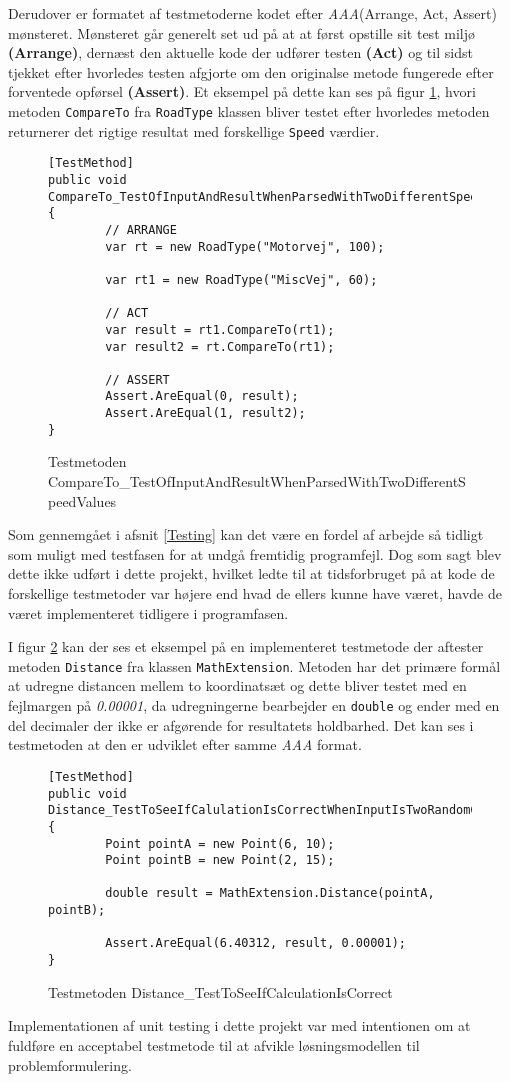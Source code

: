 \vspace{5mm}

Derudover er formatet af testmetoderne kodet efter \textit{AAA}(Arrange, Act, Assert) mønsteret. Mønsteret går generelt set ud på at at først opstille sit test miljø \textbf{(Arrange)}, dernæst den aktuelle kode der udfører testen \textbf{(Act)} og til sidst tjekket efter hvorledes testen afgjorte om den originalse metode fungerede efter forventede opførsel \textbf{(Assert)}. Et eksempel på dette kan ses på figur \ref{comparetotestmetode}, hvori metoden \texttt{CompareTo} fra \texttt{RoadType} klassen bliver testet efter hvorledes metoden returnerer det rigtige resultat med forskellige \texttt{Speed} værdier.

\begin{figure}[H]
\begin{lstlisting}
[TestMethod]
public void CompareTo_TestOfInputAndResultWhenParsedWithTwoDifferentSpeedValues()
{
		// ARRANGE
		var rt = new RoadType("Motorvej", 100);
           
		var rt1 = new RoadType("MiscVej", 60);

		// ACT
		var result = rt1.CompareTo(rt1);
		var result2 = rt.CompareTo(rt1);

		// ASSERT    
		Assert.AreEqual(0, result);
		Assert.AreEqual(1, result2);
}
\end{lstlisting}
\caption{Testmetoden CompareTo\_TestOfInputAndResultWhenParsedWithTwoDifferentSpeedValues}\label{comparetotestmetode}
\end{figure}

Som gennemgået i afsnit \ref{Testing} kan det være en fordel af arbejde så tidligt som muligt med testfasen for at undgå fremtidig programfejl. Dog som sagt blev dette ikke udført i dette projekt, hvilket ledte til at tidsforbruget på at kode de forskellige testmetoder var højere end hvad de ellers kunne have været, havde de været implementeret tidligere i programfasen.

I figur \ref{DistanceTestMethod} kan der ses et eksempel på en implementeret testmetode der aftester metoden \texttt{Distance} fra klassen \texttt{MathExtension}. Metoden har det primære formål at udregne distancen mellem to koordinatsæt og dette bliver testet med en fejlmargen på \textit{0.00001}, da udregningerne bearbejder en \texttt{double} og ender med en del decimaler der ikke er afgørende for resultatets holdbarhed. Det kan ses i testmetoden at den er udviklet efter samme \textit{AAA} format.

\begin{figure}[H]
\begin{lstlisting}
[TestMethod]
public void Distance_TestToSeeIfCalulationIsCorrectWhenInputIsTwoRandomCoords()
{
		Point pointA = new Point(6, 10);
		Point pointB = new Point(2, 15);

        double result = MathExtension.Distance(pointA, pointB);

        Assert.AreEqual(6.40312, result, 0.00001);
}
\end{lstlisting}
\caption{Testmetoden Distance\_TestToSeeIfCalculationIsCorrect}\label{DistanceTestMethod}
\end{figure}

Implementationen af unit testing i dette projekt var med intentionen om at fuldføre en acceptabel testmetode til at afvikle løsningsmodellen til problemformulering.
